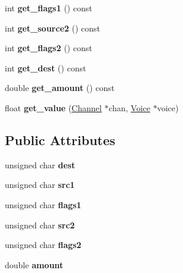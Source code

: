 \begin{DoxyCompactItemize}
int {\bfseries get\+\_\+flags1} () const
\item 
\mbox{\label{struct_fluid_s_1_1_mod_a69ccf5141984c7f2323f818f0da0764f}} 
int {\bfseries get\+\_\+source2} () const
\item 
\mbox{\label{struct_fluid_s_1_1_mod_afa202ddeaab1ec055195093193add2e8}} 
int {\bfseries get\+\_\+flags2} () const
\item 
\mbox{\label{struct_fluid_s_1_1_mod_aad9a41d0fdd81446815b51ccf70df904}} 
int {\bfseries get\+\_\+dest} () const
\item 
\mbox{\label{struct_fluid_s_1_1_mod_afb392a02f6c65a53353c78c3dc44ec14}} 
double {\bfseries get\+\_\+amount} () const
\item 
\mbox{\label{struct_fluid_s_1_1_mod_a58cf307794bfb26269a6874adcad05ed}} 
float {\bfseries get\+\_\+value} (\hyperlink{class_fluid_s_1_1_channel}{Channel} $\ast$chan, \hyperlink{class_fluid_s_1_1_voice}{Voice} $\ast$voice)
\end{DoxyCompactItemize}
\subsection*{Public Attributes}
\begin{DoxyCompactItemize}
\item 
\mbox{\label{struct_fluid_s_1_1_mod_aff97cd316677429e20f18c78aef80dd1}} 
unsigned char {\bfseries dest}
\item 
\mbox{\label{struct_fluid_s_1_1_mod_ac62dad92bd2050074d24a70556e030b6}} 
unsigned char {\bfseries src1}
\item 
\mbox{\label{struct_fluid_s_1_1_mod_ac327ae558d115e55c9711caae21bd6f5}} 
unsigned char {\bfseries flags1}
\item 
\mbox{\label{struct_fluid_s_1_1_mod_a17f79a01b5dcd662849ab2b2b0ecd864}} 
unsigned char {\bfseries src2}
\item 
\mbox{\label{struct_fluid_s_1_1_mod_a666495e6e839cb331639a3271089ba38}} 
unsigned char {\bfseries flags2}
\item 
\mbox{\label{struct_fluid_s_1_1_mod_ac7d66ac40e5904ab8382b44b713ae18e}} 
double {\bfseries amount}
\end{DoxyCompactItemize}


